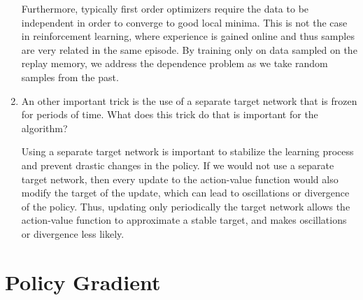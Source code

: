 \documentclass{exam}
\begin{document}
\begin{problem}
\begin{enumerate}
\begin{solutionorlines}[2in]
                Furthermore, typically first order optimizers require the data to be independent in order to converge to good local minima. This is not the case in reinforcement learning, where experience is gained online and thus samples are very related in the same episode. By training only on data sampled on the replay memory, we address the dependence problem as we take random samples from the past.
            \end{solutionorlines}
    \item An other important trick is the use of a separate target network that is frozen for periods of time. What does this trick do that is important for the algorithm?
            \begin{solutionorlines}[2in]
                Using a separate target network is important to stabilize the learning process and prevent drastic changes in the policy. If we would not use a separate target network, then every update to the action-value function would also modify the target of the update, which can lead to oscillations or divergence of the policy. Thus, updating only periodically the target network allows the action-value function to approximate a stable target, and makes oscillations or divergence less likely.
            \end{solutionorlines}
    
\end{enumerate}
\end{problem}

\setcounter{section}{5}
\section{Policy Gradient}
\end{document}
